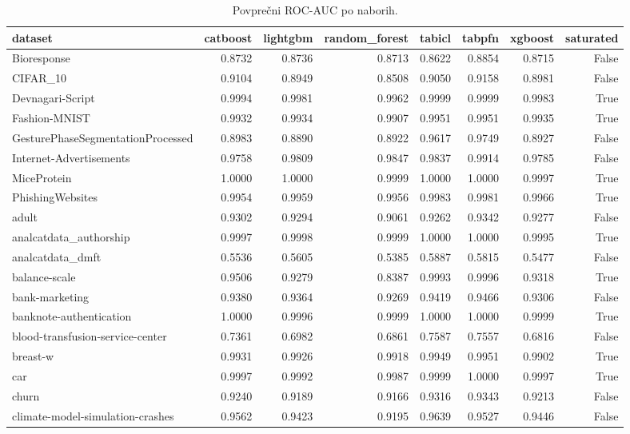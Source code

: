 \begin{table}[htbp]
\centering
\caption{Povprečni ROC-AUC po naborih.}
\label{tab:pivot}
\begin{tabular}{lrrrrrrr}
\hline
dataset & catboost & lightgbm & random\_forest & tabicl & tabpfn & xgboost & saturated \\
\hline
Bioresponse & 0.8732 & 0.8736 & 0.8713 & 0.8622 & 0.8854 & 0.8715 & False \\
CIFAR\_10 & 0.9104 & 0.8949 & 0.8508 & 0.9050 & 0.9158 & 0.8981 & False \\
Devnagari-Script & 0.9994 & 0.9981 & 0.9962 & 0.9999 & 0.9999 & 0.9983 & True \\
Fashion-MNIST & 0.9932 & 0.9934 & 0.9907 & 0.9951 & 0.9951 & 0.9935 & True \\
GesturePhaseSegmentationProcessed & 0.8983 & 0.8890 & 0.8922 & 0.9617 & 0.9749 & 0.8927 & False \\
Internet-Advertisements & 0.9758 & 0.9809 & 0.9847 & 0.9837 & 0.9914 & 0.9785 & False \\
MiceProtein & 1.0000 & 1.0000 & 0.9999 & 1.0000 & 1.0000 & 0.9997 & True \\
PhishingWebsites & 0.9954 & 0.9959 & 0.9956 & 0.9983 & 0.9981 & 0.9966 & True \\
adult & 0.9302 & 0.9294 & 0.9061 & 0.9262 & 0.9342 & 0.9277 & False \\
analcatdata\_authorship & 0.9997 & 0.9998 & 0.9999 & 1.0000 & 1.0000 & 0.9995 & True \\
analcatdata\_dmft & 0.5536 & 0.5605 & 0.5385 & 0.5887 & 0.5815 & 0.5477 & False \\
balance-scale & 0.9506 & 0.9279 & 0.8387 & 0.9993 & 0.9996 & 0.9318 & True \\
bank-marketing & 0.9380 & 0.9364 & 0.9269 & 0.9419 & 0.9466 & 0.9306 & False \\
banknote-authentication & 1.0000 & 0.9996 & 0.9999 & 1.0000 & 1.0000 & 0.9999 & True \\
blood-transfusion-service-center & 0.7361 & 0.6982 & 0.6861 & 0.7587 & 0.7557 & 0.6816 & False \\
breast-w & 0.9931 & 0.9926 & 0.9918 & 0.9949 & 0.9951 & 0.9902 & True \\
car & 0.9997 & 0.9992 & 0.9987 & 0.9999 & 1.0000 & 0.9997 & True \\
churn & 0.9240 & 0.9189 & 0.9166 & 0.9316 & 0.9343 & 0.9213 & False \\
climate-model-simulation-crashes & 0.9562 & 0.9423 & 0.9195 & 0.9639 & 0.9527 & 0.9446 & False \\

\end{tabular}
\end{table}
